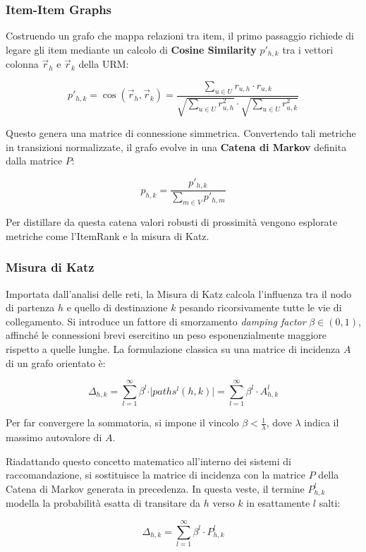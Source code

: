 \subsubsection{Item-Item Graphs}
Costruendo un grafo che mappa relazioni tra item, il primo passaggio richiede di legare gli item mediante un calcolo di \textbf{Cosine Similarity} $p'_{h,k}$ tra i vettori colonna $\vec{r}_h$ e $\vec{r}_k$ della URM:


$$p'_{h,k} = \cos(\vec{r}_h, \vec{r}_k) = \frac{\sum_{u \in U} r_{u,h} \cdot r_{u,k}}{\sqrt{\sum_{u \in U} r_{u,h}^2} \cdot \sqrt{\sum_{u \in U} r_{u,k}^2}}$$


Questo genera una matrice di connessione simmetrica. Convertendo tali metriche in transizioni normalizzate, il grafo evolve in una \textbf{Catena di Markov} definita dalla matrice $P$:


$$p_{h,k} = \frac{p'_{h,k}}{\sum_{m \in V} p'_{h,m}}$$


Per distillare da questa catena valori robusti di prossimità vengono esplorate metriche come l'ItemRank e la misura di Katz.

\subsubsection{Misura di Katz}
Importata dall'analisi delle reti, la Misura di Katz calcola l'influenza tra il nodo di partenza $h$ e quello di destinazione $k$ pesando ricorsivamente tutte le vie di collegamento. Si introduce un fattore di smorzamento \textit{damping factor} $\beta \in (0,1)$, affinché le connessioni brevi esercitino un peso esponenzialmente maggiore rispetto a quelle lunghe.
La formulazione classica su una matrice di incidenza $A$ di un grafo orientato è:


$$\Delta_{h,k} = \sum_{l=1}^{\infty} \beta^l \cdot \vert{}paths^l(h,k)\vert{} = \sum_{l=1}^{\infty} \beta^l \cdot A_{h,k}^l$$


Per far convergere la sommatoria, si impone il vincolo $\beta < \frac{1}{\lambda}$, dove $\lambda$ indica il massimo autovalore di $A$.

Riadattando questo concetto matematico all'interno dei sistemi di raccomandazione, si sostituisce la matrice di incidenza con la matrice $P$ della Catena di Markov generata in precedenza. In questa veste, il termine $P_{h,k}^l$ modella la probabilità esatta di transitare da $h$ verso $k$ in esattamente $l$ salti:


$$\Delta_{h,k} = \sum_{l=1}^{\infty} \beta^l \cdot P_{h,k}^l$$


